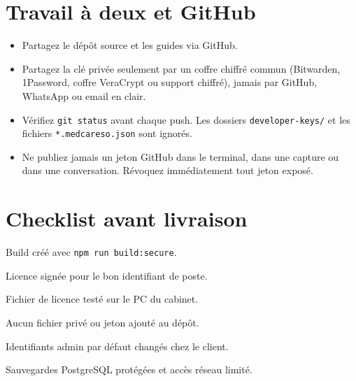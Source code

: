 \documentclass[11pt,a4paper]{article}
\begin{document}
\section{Travail à deux et GitHub}
\begin{itemize}
\item Partagez le dépôt source et les guides via GitHub.
\item Partagez la clé privée seulement par un coffre chiffré commun (Bitwarden,
1Password, coffre VeraCrypt ou support chiffré), jamais par GitHub, WhatsApp ou
email en clair.
\item Vérifiez \texttt{git status} avant chaque push. Les dossiers
\texttt{developer-keys/} et les fichiers \texttt{*.medcareso.json} sont ignorés.
\item Ne publiez jamais un jeton GitHub dans le terminal, dans une capture ou
dans une conversation. Révoquez immédiatement tout jeton exposé.
\end{itemize}

\section*{Checklist avant livraison}
\begin{enumerate}[label={[\ ]}]
\item Build créé avec \texttt{npm run build:secure}.
\item Licence signée pour le bon identifiant de poste.
\item Fichier de licence testé sur le PC du cabinet.
\item Aucun fichier privé ou jeton ajouté au dépôt.
\item Identifiants admin par défaut changés chez le client.
\item Sauvegardes PostgreSQL protégées et accès réseau limité.
\end{enumerate}
\end{document}
